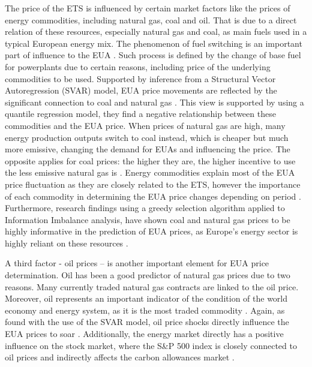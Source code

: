 \documentclass[12pt, letterpaper]{article}
\begin{document}
The price of the ETS is influenced by certain market factors like the prices of energy commodities, including natural gas, coal and oil. That is due to a direct relation of these resources, especially natural gas and coal, as main fuels used in a typical European energy mix. The phenomenon of fuel switching is an important part of influence to the EUA \parencite{lovcha2021}. Such process is defined by the change of base fuel for powerplants due to certain reasons, including price of the underlying commodities to be used. Supported by inference from a Structural Vector Autoregression (SVAR) model, EUA price movements are reflected by the significant connection to coal and natural gas \parencite{lovcha2021}. This view is supported by \textcite{tan2017} using a quantile regression model, they find a negative relationship between these commodities and the EUA price. When prices of natural gas are high, many energy production outputs switch to coal instead, which is cheaper but much more emissive, changing the demand for EUAs and influencing the price. The opposite applies for coal prices: the higher they are, the higher incentive to use the less emissive natural gas is \parencite{lovcha2021, tan2017}. Energy commodities explain most of the EUA price fluctuation as they are closely related to the ETS, however the importance of each commodity in determining the EUA price changes depending on period \parencite{lovcha2021}. Furthermore, research findings using a greedy selection algorithm applied to Information Imbalance analysis, have shown coal and natural gas prices to be highly informative in the prediction of EUA prices, as Europe’s energy sector is highly reliant on these resources \parencite{salvagnin2024}.

A third factor - oil prices – is another important element for EUA price determination. Oil has been a good predictor of natural gas prices due to two reasons. Many currently traded natural gas contracts are linked to the oil price. Moreover, oil represents an important indicator of the condition of the world economy and energy system, as it is the most traded commodity \parencite{lovcha2021}.  Again, as found with the use of the SVAR model, oil price shocks directly influence the EUA prices to soar \parencite{lovcha2021}. Additionally, the energy market directly has a positive influence on the stock market, where the S\&P 500 index is closely connected to oil prices and indirectly affects the carbon allowances market \parencite{wang2020}. 
\end{document}
